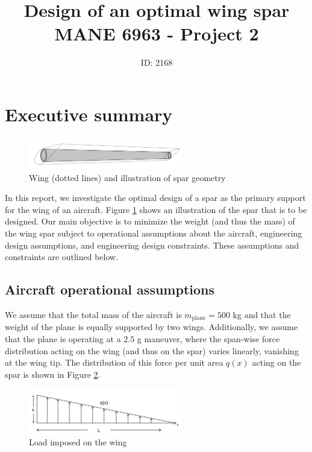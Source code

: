\documentclass[11pt]{article}
\title{Design of an optimal wing spar\\MANE 6963 - Project 2}
\author{ID: 2168}
\date{}
\begin{document}
\maketitle
\tableofcontents
\newpage

\section{Executive summary}

\begin{figure}[hbt]
\centering
\includegraphics[width=0.6\textwidth]{spar}
\caption{Wing (dotted lines) and illustration of spar geometry}
\label{fig:spar}
\end{figure}

In this report, we investigate the optimal design of a
spar as the primary support for the wing of an aircraft.
Figure \ref{fig:spar} shows an illustration of the spar
that is to be designed. Our main objective is to minimize the
weight (and thus the mass) of the wing spar subject to
operational assumptions about the aircraft,
engineering design assumptions, and engineering
design constraints. These assumptions and
constraints are outlined below.

\subsection{Aircraft operational assumptions}

We assume that the total mass of the aircraft
is $m_{\text{plane}} = 500$ kg and that the weight
of the plane is equally supported by two wings.
Additionally, we assume that the plane is operating
at a $2.5$ g maneuver, where the span-wise force
distribution acting on the wing (and thus on the spar)
varies linearly, vanishing at the wing tip. The
distribution of this force per unit area $q(x)$
acting on the spar is shown in Figure \ref{fig:load}.

\begin{figure}[hbt]
\centering
\includegraphics[width=0.6\textwidth]{load}
\caption{Load imposed on the wing}
\label{fig:load}
\end{figure}
\end{document}
